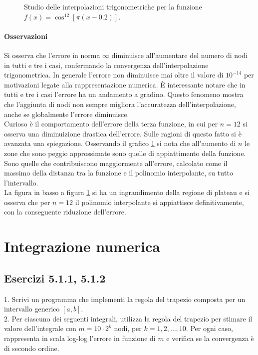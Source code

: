 \documentclass[letterpaper, 12pt]{article}
\numberwithin{equation}{section}    %
\begin{document}
\begin{figure}[!ht]
\begin{minipage}[b]{0.47\textwidth}
    \end{minipage}
    \caption{Studio delle interpolazioni trigonometriche per la funzione $f(x) = \cos^{12}[\pi (x-0.2)]$.}
    \label{fig:es4_6_1_3}
\end{figure}

\paragraph{Osservazioni}
Si osserva che l'errore in norma $\infty$ diminuisce all'aumentare del numero di nodi in tutti e tre i casi, 
confermando la convergenza dell'interpolazione trigonometrica. In generale l'errore non diminuisce mai oltre
il valore di $10^{-14}$ per motivazioni legate alla rappresentazione numerica. È interessante notare che 
in tutti e tre i casi l'errore ha un andamento a gradino. Questo fenomeno mostra che l'aggiunta di nodi 
non sempre migliora l'accuratezza dell'interpolazione, anche se globalmente l'errore diminuisce. \\
Curioso è il comportamento dell'errore della terza funzione, in cui per $n = 12$ si osserva una
diminuizione drastica dell'errore. Sulle ragioni di questo fatto si è avanzata una spiegazione. 
Osservando il grafico \ref{fig:es4_6_1_3} si nota che all'aumento di $n$ le zone che sono peggio approssimate sono 
quelle di appiattimento della funzione. Sono quelle che contribuiscono maggiormente all'errore, calcolato
come il massimo della distanza tra la funzione e il polinomio interpolante, su tutto l'intervallo. \\
La figura in basso a figura \ref{fig:es4_6_1_3} si ha un ingrandimento della regione di plateau e 
si osserva che per $n=12$ il polinomio interpolante si appiattisce definitivamente, con la conseguente 
riduzione dell'errore.

\section{Integrazione numerica}
\subsection{Esercizi 5.1.1, 5.1.2}
1. Scrivi un programma che implementi la regola del trapezio composta per un intervallo generico $[a,b]$. \\
2. Per ciascuno dei seguenti integrali, utilizza la regola del trapezio per stimare il valore dell'integrale 
con $m=10\cdot 2^k$ nodi, per $k=1,2,\ldots,10$. Per ogni caso, rappresenta in scala log-log l'errore in funzione 
di $m$ e verifica se la convergenza è di secondo ordine.
\end{document}
